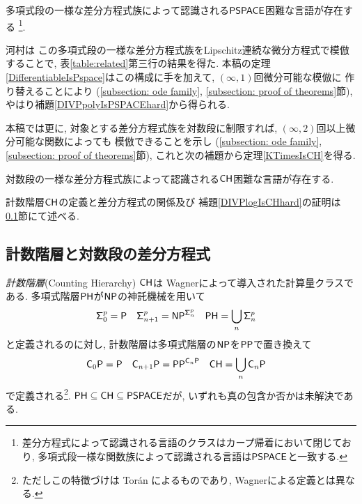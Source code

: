\begin{lemma}
 \label{DIVPpolyIsPSPACEhard}
 多項式段の一様な差分方程式族によって認識される$\mathsf{PSPACE}$困難な言語が存在する
 \footnote{差分方程式によって認識される言語のクラスはカープ帰着において閉じており,
多項式段一様な関数族によって認識される言語は$\mathsf{PSPACE}$と一致する.}.
\end{lemma}

河村\cite{kawamura2010lipschitz}は
この多項式段の一様な差分方程式族をLipschitz連続な微分方程式で模倣することで, 
表\ref{table:related}第三行の結果を得た. 
本稿の定理\ref{DifferentiableIsPspace}はこの構成に手を加えて, 
$(\infty, 1)$回微分可能な模倣に
作り替えることにより
(\ref{subsection: ode family}, \ref{subsection: proof of theorems}節), 
やはり補題\ref{DIVPpolyIsPSPACEhard}から得られる. 

本稿では更に, 対象とする差分方程式族を対数段に制限すれば, 
$(\infty, 2)$回以上微分可能な関数によっても
模倣できることを示し
(\ref{subsection: ode family}, \ref{subsection: proof of theorems}節), 
これと次の補題から定理\ref{KTimesIsCH}を得る. 

\begin{lemma}
 \label{DIVPlogIsCHhard}
 対数段の一様な差分方程式族によって認識される$\mathsf{CH}$困難な言語が存在する.
\end{lemma}

計数階層$\mathsf{CH}$の定義と差分方程式の関係及び
補題\ref{DIVPlogIsCHhard}の証明は
\ref{subsection: counting hierarchy}節にて述べる.


\subsection{計数階層と対数段の差分方程式}
\label{subsection: counting hierarchy}

\emph{計数階層}\kern\xkanjiskip(Counting Hierarchy) $\mathsf{CH}$は
Wagnerによって導入された計算量クラスである\cite{wagner1986complexity}.
多項式階層$\mathsf{PH}$が$\mathsf{NP}$の神託機械を用いて
\begin{align}
 \mathsf{\Sigma}^p_0  &= \mathsf{P}
 &
 \mathsf{\Sigma}^p_{n+1} &= \mathsf{NP} ^{\mathsf{\Sigma}^p_n}
 &
 \mathsf{PH} &= \bigcup_n \mathsf{\Sigma}^p_n
\end{align}
と定義されるのに対し,
計数階層は多項式階層の$\mathsf{NP}$を$\mathsf{PP}$で置き換えて
\begin{align} \label{eq:CH}
 \mathsf{C}_0 \mathsf{P}  &= \mathsf{P}
 &
 \mathsf{C}_{n+1} \mathsf{P} &= \mathsf{PP}^{\mathsf{C}_n \mathsf{P}}
 &
 \mathsf{CH} &= \bigcup_n \mathsf{C}_n \mathsf{P}
\end{align}
で定義される\footnote{ただしこの特徴づけは Tor{\'a}n によるものであり,
Wagnerによる定義とは異なる\cite{toran1991complexity}.
}. $\mathsf{PH} \subseteq \mathsf{CH} \subseteq \mathsf{PSPACE}$だが,
いずれも真の包含か否かは未解決である.




